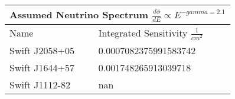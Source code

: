 \documentclass[]{article}
\begin{document}
\begin{tabular}{ |p{3.5cm}||p{4.5cm}|} 
\hline 
\multicolumn{2}{|c|}{Assumed Neutrino Spectrum $ \frac {d \phi}{dE} \propto E ^ {-gamma=2.1} $} \\ 
\hline 
Name&Integrated Sensitivity $\frac{1}{cm^{2}} $ \\ 
\hline 
Swift J2058+05 & \num[round-precision=2, round-mode=figures, scientific-notation=true]{0.0007082375991583742}  \\ 
Swift J1644+57 & \num[round-precision=2, round-mode=figures, scientific-notation=true]{0.001748265913039718}  \\ 
Swift J1112-82 & \num[round-precision=2, round-mode=figures, scientific-notation=true]{nan}  \\ 
\hline 
\end{tabular} 
\end{document}
